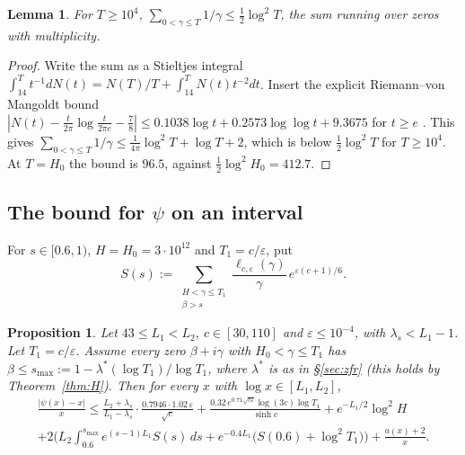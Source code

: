 \documentclass[11pt]{amsart}
\numberwithin{equation}{section}
\newtheorem{lemma}[theorem]{Lemma}
\newtheorem{proposition}[theorem]{Proposition}
\theoremstyle{definition}
\theoremstyle{remark}
\newcommand{\eps}{\varepsilon}
\begin{document}
\begin{lemma}\label{lem:sumrecip}
For $T \ge 10^4$, $\sum_{0<\gamma\le T} 1/\gamma \le \frac12\log^2 T$, the sum running over zeros with multiplicity.
\end{lemma}

\begin{proof}
Write the sum as a Stieltjes integral $\int_{14}^{T} t^{-1}dN(t) = N(T)/T + \int_{14}^T N(t)t^{-2}dt$.
Insert the explicit Riemann--von Mangoldt bound $|N(t) - \frac t{2\pi}\log\frac t{2\pi e} - \frac78| \le 0.1038\log t + 0.2573\log\log t + 9.3675$ for $t \ge e$ \cite{HSW}.
This gives $\sum_{0<\gamma\le T}1/\gamma \le \frac1{4\pi}\log^2T + \log T + 2$, which is below $\frac12\log^2T$ for $T \ge 10^4$.
At $T = H_0$ the bound is $96.5$, against $\frac12\log^2H_0 = 412.7$.
\end{proof}

\subsection{The bound for $\psi$ on an interval}
For $s \in [0.6, 1)$, $H = H_0 = 3\cdot 10^{12}$ and $T_1 = c/\eps$, put
\[
S(s) := \sum_{\substack{H < \gamma \le T_1\\ \beta > s}} \frac{\ell_{c,\eps}(\gamma)}{\gamma}\,e^{\eps(c+1)/6}.
\]

\begin{proposition}\label{prop:master}
Let $43 \le L_1 < L_2$, $c \in [30,110]$ and $\eps \le 10^{-4}$, with $\lambda_s < L_1 - 1$. Let $T_1 = c/\eps$.
Assume every zero $\beta+i\gamma$ with $H_0<\gamma \le T_1$ has $\beta \le s_{\max} := 1 - \lambda^*(\log T_1)/\log T_1$, where $\lambda^*$ is as in \S\ref{sec:zfr} (this holds by Theorem~\ref{thm:H}).
Then for every $x$ with $\log x\in[L_1,L_2]$,
\begin{multline*}
\frac{|\psi(x)-x|}{x} \le \frac{L_2+\lambda_s}{L_1-\lambda_s}\cdot\frac{0.7946\cdot 1.02\,\eps}{\sqrt c}
+ \frac{0.32\,e^{0.71\sqrt{c\eps}}\log(3c)\log T_1}{\sinh c} + e^{-L_1/2}\log^2 H\\
+ 2\Big(L_2\int_{0.6}^{s_{\max}} e^{(s-1)L_1}S(s)\,ds + e^{-0.4L_1}\big(S(0.6) + \log^2 T_1\big)\Big) + \frac{a(x)+2}{x}.
\end{multline*}
\end{proposition}
\end{document}
